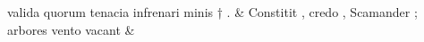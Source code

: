 \documentclass[12pt,onecolumn,twoside,a4paper]{memoir}
\begin{document}
\begin{pairs}
\begin{Leftside}
                              valida
                              quorum
                              tenacia
                              infrenari
                              minis
                              †
                              . \&
                         \stanza {}
                     Constitit
                              ,
                              credo
                              ,
                              Scamander
                              ;
                              arbores
                              vento
                              vacant \&
                         \stanza {}
                     

\end{Leftside}
\end{pairs}
\end{document}
